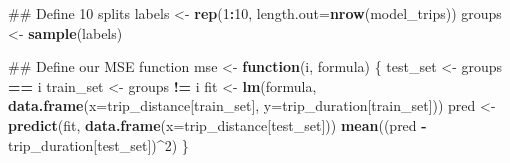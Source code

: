 \documentclass[]{article}
\newenvironment{Shaded}{\begin{snugshade}}{\end{snugshade}}
\newcommand{\KeywordTok}[1]{\textcolor[rgb]{0.13,0.29,0.53}{\textbf{#1}}}
\newcommand{\DataTypeTok}[1]{\textcolor[rgb]{0.13,0.29,0.53}{#1}}
\newcommand{\DecValTok}[1]{\textcolor[rgb]{0.00,0.00,0.81}{#1}}
\newcommand{\StringTok}[1]{\textcolor[rgb]{0.31,0.60,0.02}{#1}}
\newcommand{\ControlFlowTok}[1]{\textcolor[rgb]{0.13,0.29,0.53}{\textbf{#1}}}
\newcommand{\OperatorTok}[1]{\textcolor[rgb]{0.81,0.36,0.00}{\textbf{#1}}}
\newcommand{\NormalTok}[1]{#1}
\begin{document}
\begin{Shaded}
\begin{Highlighting}[]
\NormalTok{## Define 10 splits}
\NormalTok{labels <-}\StringTok{ }\KeywordTok{rep}\NormalTok{(}\DecValTok{1}\OperatorTok{:}\DecValTok{10}\NormalTok{, }\DataTypeTok{length.out=}\KeywordTok{nrow}\NormalTok{(model_trips))}
\NormalTok{groups <-}\StringTok{ }\KeywordTok{sample}\NormalTok{(labels)}

\NormalTok{## Define our MSE function}
\NormalTok{mse <-}\StringTok{ }\ControlFlowTok{function}\NormalTok{(i, formula) \{}
\NormalTok{    test_set <-}\StringTok{ }\NormalTok{groups }\OperatorTok{==}\StringTok{ }\NormalTok{i}
\NormalTok{    train_set <-}\StringTok{ }\NormalTok{groups }\OperatorTok{!=}\StringTok{ }\NormalTok{i}
\NormalTok{    fit <-}\StringTok{ }\KeywordTok{lm}\NormalTok{(formula, }
              \KeywordTok{data.frame}\NormalTok{(}\DataTypeTok{x=}\NormalTok{trip_distance[train_set], }\DataTypeTok{y=}\NormalTok{trip_duration[train_set]))}
\NormalTok{    pred <-}\StringTok{ }\KeywordTok{predict}\NormalTok{(fit, }\KeywordTok{data.frame}\NormalTok{(}\DataTypeTok{x=}\NormalTok{trip_distance[test_set]))}
    \KeywordTok{mean}\NormalTok{((pred }\OperatorTok{-}\StringTok{ }\NormalTok{trip_duration[test_set])}\OperatorTok{^}\DecValTok{2}\NormalTok{)}
\NormalTok{\}   }


\end{Highlighting}
\end{Shaded}
\end{document}
